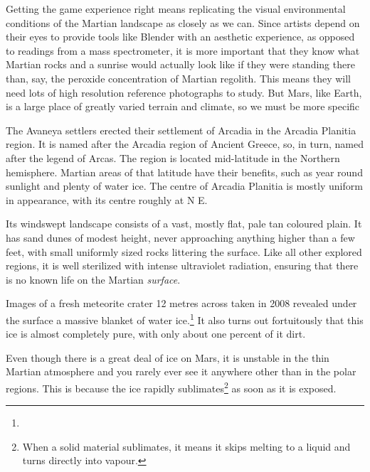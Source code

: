 


Getting the game experience right means replicating the visual environmental conditions of the Martian landscape as closely as we can. Since artists depend on their eyes to provide tools like Blender with an aesthetic experience, as opposed to readings from a mass spectrometer, it is more important that they know what Martian rocks and a sunrise would actually look like if they were standing there than, say, the peroxide concentration of Martian regolith. This means they will need lots of high resolution reference photographs to study. But Mars, like Earth, is a large place of greatly varied terrain and climate, so we must be more specific

The Avaneya settlers erected their settlement of Arcadia in the Arcadia Planitia region. It is named after the Arcadia region of Ancient Greece, so, in turn, named after the legend of Arcas. The region is located mid-latitude in the Northern hemisphere. Martian areas of that latitude have their benefits, such as year round sunlight and plenty of water ice. The centre of Arcadia Planitia is mostly uniform in appearance, with its centre roughly at N E.

Its windswept landscape consists of a vast, mostly flat, pale tan coloured plain. It has sand dunes of modest height, never approaching anything higher than a few feet, with small uniformly sized rocks littering the surface. Like all other explored regions, it is well sterilized with intense ultraviolet radiation, ensuring that there is no known life on the Martian {\it surface}.

Images of a fresh meteorite crater 12 metres across taken in 2008 revealed under the surface a massive blanket of water ice.\footnote{} It also turns out fortuitously that this ice is almost completely pure, with only about one percent of it dirt.

Even though there is a great deal of ice on Mars, it is unstable in the thin Martian atmosphere and you rarely ever see it anywhere other than in the polar regions. This is because the ice rapidly sublimates\footnote{When a solid material sublimates, it means it skips melting to a liquid and turns directly into vapour.} as soon as it is exposed.

